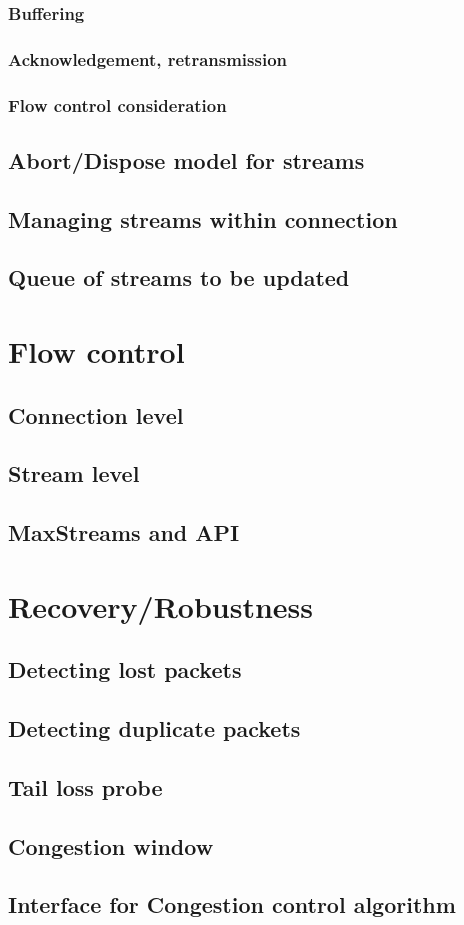 \subsubsection{Buffering}
\subsubsection{Acknowledgement, retransmission}
\subsubsection{Flow control consideration}

\subsection{Abort/Dispose model for streams}
\subsection{Managing streams within connection}
\subsection{Queue of streams to be updated}


\section{Flow control}

\subsection{Connection level}
\subsection{Stream level}
\subsection{MaxStreams and API}


\section{Recovery/Robustness}

\subsection{Detecting lost packets}
\subsection{Detecting duplicate packets}
\subsection{Tail loss probe}
\subsection{Congestion window}
\subsection{Interface for Congestion control algorithm}
